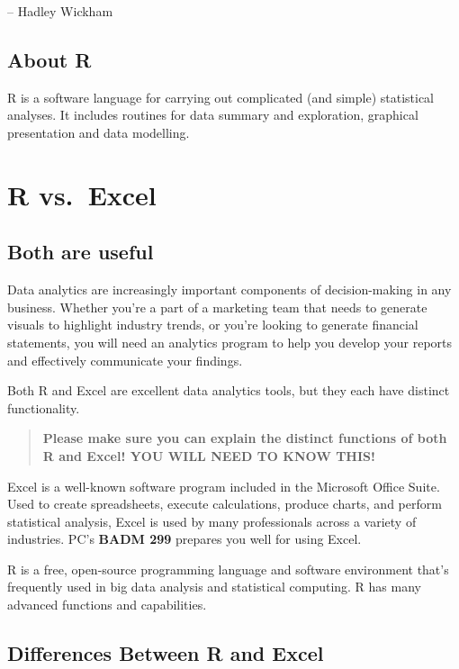 \documentclass[
]{book}
\begin{document}
-- Hadley Wickham

\hypertarget{about-r}{%
\section{About R}\label{about-r}}

R is a software language for carrying out complicated (and simple) statistical analyses. It includes routines for data summary and exploration, graphical presentation and data modelling.

\hypertarget{r-vs.-excel}{%
\chapter{R vs.~Excel}\label{r-vs.-excel}}

\hypertarget{both-are-useful}{%
\section{Both are useful}\label{both-are-useful}}

Data analytics are increasingly important components of decision-making in any business. Whether you're a part of a marketing team that needs to generate visuals to highlight industry trends, or you're looking to generate financial statements, you will need an analytics program to help you develop your reports and effectively communicate your findings.

Both R and Excel are excellent data analytics tools, but they each have distinct functionality.

\begin{quote}
\textbf{Please make sure you can explain the distinct functions of both R and Excel! YOU WILL NEED TO KNOW THIS!}
\end{quote}

Excel is a well-known software program included in the Microsoft Office Suite. Used to create spreadsheets, execute calculations, produce charts, and perform statistical analysis, Excel is used by many professionals across a variety of industries. PC's \textbf{BADM 299} prepares you well for using Excel.

R is a free, open-source programming language and software environment that's frequently used in big data analysis and statistical computing. R has many advanced functions and capabilities.

\hypertarget{differences-between-r-and-excel}{%
\section{Differences Between R and Excel}\label{differences-between-r-and-excel}}
\end{document}

